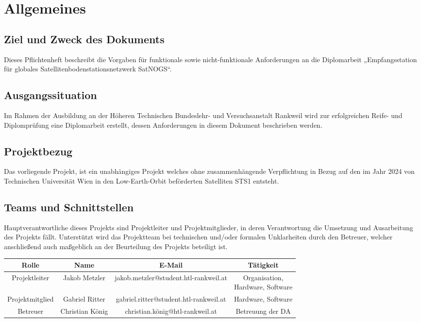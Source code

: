 \section{Allgemeines}
\subsection{Ziel und Zweck des Dokuments}
Dieses Pflichtenheft beschreibt die Vorgaben für funktionale sowie nicht-funktionale Anforderungen an die Diplomarbeit „Empfangsstation für globales Satellitenbodenstationsnetzwerk SatNOGS“. 

\subsection{Ausgangssituation}
Im Rahmen der Ausbildung an der Höheren Technischen Bundeslehr- und Versuchsanstalt Rankweil wird zur erfolgreichen Reife- und Diplomprüfung eine Diplomarbeit erstellt, dessen Anforderungen in diesem Dokument beschrieben werden. 

\subsection{Projektbezug}
Das vorliegende Projekt, ist ein unabhängiges Projekt welches ohne zusammenhängende Verpflichtung in Bezug auf den im Jahr 2024 von Technischen Universität Wien in den Low-Earth-Orbit beförderten Satelliten STS1 entsteht. 

\subsection{Teams und Schnittstellen}
Hauptverantwortliche dieses Projekts sind Projektleiter und Projektmitglieder, in deren 
Verantwortung die Umsetzung und Ausarbeitung des Projekts fällt. Unterstützt wird das Projektteam bei technischen und/oder formalen Unklarheiten durch den Betreuer, welcher anschließend auch maßgeblich an der Beurteilung des Projekts beteiligt ist.

\begin{tabular}{|c|c|c|c|}
	\hline
	Rolle & Name & E-Mail & Tätigkeit \\
	\hline
	Projektleiter & Jakob Metzler & jakob.metzler@student.htl-rankweil.at & \parbox{2cm}{Organisation,\\ Hardware, Software}\\
	\hline
	Projektmitglied & Gabriel Ritter & gabriel.ritter@student.htl-rankweil.at & Hardware, Software \\
	\hline
	Betreuer & Christian König & christian.könig@htl-rankweil.at & Betreuung der DA \\
	\hline
\end{tabular}

